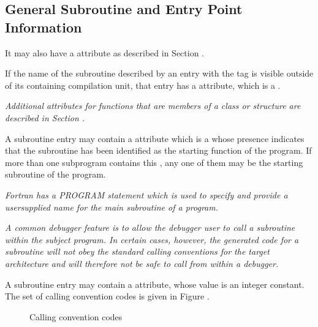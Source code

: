 \subsection{General Subroutine and Entry Point Information}
\label{chap:generalsubroutineandentrypointinformation}

It may also have a  attribute as
described in Section .

If the name of the subroutine described by an entry with the
tag  is visible outside of its containing
compilation unit, that entry has a  attribute,
which is a .

\textit{Additional attributes for functions that are members of a
class or structure are described in 
Section .
}

A subroutine entry may contain a 
attribute which is 
a  whose presence indicates that the
subroutine has been identified as the starting function of
the program.  If more than one subprogram contains this 
,
any one of them may be the starting subroutine of the program.

\textit{Fortran has a PROGRAM statement which is used to specify
and provide a user\dash supplied name for the main subroutine of
a program.
}

\textit{A common debugger feature is to allow the debugger user to call
a subroutine within the subject program. In certain cases,
however, the generated code for a subroutine will not obey
the standard calling conventions for the target architecture
and will therefore not be safe to call from within a debugger.
}

A subroutine entry may contain a 
attribute, whose value is an integer constant. The set of
calling convention codes is given in 
Figure .

\begin{figure}[here]
\caption{Calling convention codes}\label{fig:callingconventioncodes}
\end{figure}

